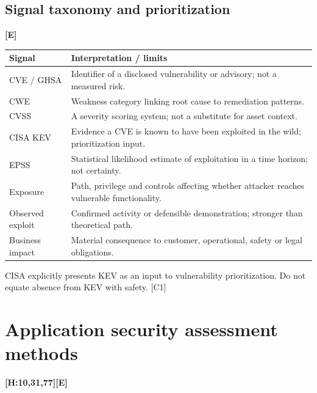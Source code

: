 \documentclass[10pt,letterpaper,oneside]{article}
\newcommand{\handbookref}[1]{\textsf{\color{accent}\textbf{[H:#1]}}}
\newcommand{\modernext}{\textsf{\color{muted}\textbf{[E]}}}
\begin{document}
\subsection{Signal taxonomy and prioritization}\modernext{}
\par\medskip\noindent\begin{tabularx}{\textwidth}{@{}p{}X@{}}\toprule
Signal & Interpretation / limits \\ \midrule
CVE / GHSA & Identifier of a disclosed vulnerability or advisory; not a measured risk.\\
CWE & Weakness category linking root cause to remediation patterns.\\
CVSS & A severity scoring system; not a substitute for asset context.\\
CISA KEV & Evidence a CVE is known to have been exploited in the wild; prioritization input.\\
EPSS & Statistical likelihood estimate of exploitation in a time horizon; not certainty.\\
Exposure & Path, privilege and controls affecting whether attacker reaches vulnerable functionality.\\
Observed exploit & Confirmed activity or defensible demonstration; stronger than theoretical path.\\
Business impact & Material consequence to customer, operational, safety or legal obligations.\\
\bottomrule\end{tabularx}\par\medskip
CISA explicitly presents KEV as an input to vulnerability prioritization. Do not equate absence from KEV with safety. [C1]

\section{Application security assessment methods}\handbookref{10,31,77}\modernext{}
\end{document}

